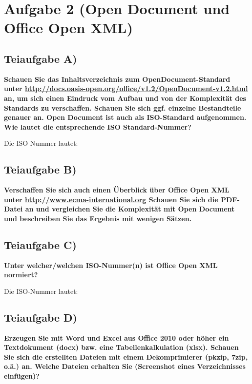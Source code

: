 \section{Aufgabe 2 (Open Document und Office Open XML)}

\subsection{Teiaufgabe A)}
\textbf{Schauen Sie das Inhaltsverzeichnis zum OpenDocument-Standard unter
\url{http://docs.oasis-open.org/office/v1.2/OpenDocument-v1.2.html} an, um sich
einen Eindruck vom Aufbau und von der Komplexität des Standards zu verschaffen. Schauen
Sie sich ggf. einzelne Bestandteile genauer an. Open Document ist auch als
ISO-Standard aufgenommen. Wie lautet die entsprechende ISO Standard-Nummer?}

Die ISO-Nummer lautet:

\subsection{Teiaufgabe B)}
\textbf{Verschaffen Sie sich auch einen Überblick über Office Open XML unter
\href{http://www.ecma-international.org/publications/files/ECMA-ST/ECMA-376,
Fifth Edition, Part 1 - Fundamentals And Markup Language
Reference.zip}{http://www.ecma-international.org} Schauen Sie sich die
PDF-Datei an und vergleichen Sie die Komplexität mit Open Document und
beschreiben Sie das Ergebnis mit wenigen Sätzen.}

\subsection{Teiaufgabe C)}
\textbf{Unter welcher/welchen ISO-Nummer(n) ist Office Open XML normiert?}

Die ISO-Nummer lautet:

\clearpage 

\subsection{Teiaufgabe D)}
\textbf{Erzeugen Sie mit Word und Excel aus Office 2010 oder höher ein Textdokument (docx)
bzw. eine Tabellenkalkulation (xlsx). Schauen Sie sich die erstellten Dateien mit einem
Dekomprimierer (pkzip, 7zip, o.ä.) an. Welche Dateien erhalten Sie (Screenshot eines
Verzeichnisses einfügen)?}

